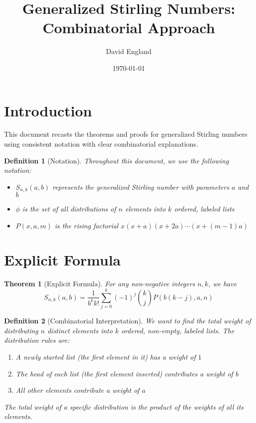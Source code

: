 \documentclass{article}
\title{Generalized Stirling Numbers: Combinatorial Approach}
\author{David England}
\date{\today}
\newtheorem{theorem}{Theorem}
\newtheorem{definition}{Definition}
\newcommand{\gsn}[2]{S_{#1,#2}(a,b)}
\newcommand{\rising}[3]{P(#1,#2,#3)}
\begin{document}
\maketitle

\section{Introduction}

This document recasts the theorems and proofs for generalized Stirling numbers using consistent notation with clear combinatorial explanations.

\begin{definition}[Notation]
Throughout this document, we use the following notation:
\begin{itemize}
    \item $\gsn{n}{k}$ represents the generalized Stirling number with parameters $a$ and $b$
    \item $\phi$ is the set of all distributions of $n$ elements into $k$ ordered, labeled lists
    \item $\rising{x}{a}{m}$ is the rising factorial $x(x+a)(x+2a)\cdots(x+(m-1)a)$
\end{itemize}
\end{definition}

\section{Explicit Formula}

\begin{theorem}[Explicit Formula]
For any non-negative integers $n,k$, we have
\begin{equation}
\gsn{n}{k}=\frac{1}{b^{k}k!}\sum_{j=0}^{k}(-1)^{j}\binom{k}{j}\rising{b(k-j)}{a}{n}
\end{equation}
\end{theorem}

\begin{definition}[Combinatorial Interpretation]
We want to find the total weight of distributing $n$ distinct elements into $k$ ordered, non-empty, labeled lists. The distribution rules are:
\begin{enumerate}
    \item A newly started list (the first element in it) has a weight of $1$
    \item The head of each list (the first element inserted) contributes a weight of $b$
    \item All other elements contribute a weight of $a$
\end{enumerate}
The total weight of a specific distribution is the product of the weights of all its elements.
\end{definition}
\end{document}
